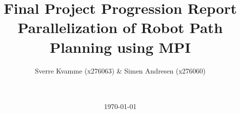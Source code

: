 



\title{Final Project Progression Report \\ Parallelization of Robot Path Planning using MPI}
\author{Sverre Kvamme (x276063) \& Simen Andresen (x276060)}
\date{\ \\ \ \\ \today}




\maketitle


\pagestyle{fancy}
\lhead{}
\setcounter{page}{1}

\cfoot{\thepage}



%



